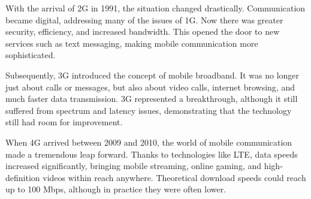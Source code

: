 \documentclass[english]{article}
\begin{document}
With the arrival of 2G in 1991, the situation changed drastically.
Communication became digital, addressing many of the issues of 1G. Now there
was greater security, efficiency, and increased bandwidth. This opened the door
to new services such as text messaging, making mobile communication more
sophisticated.

Subsequently, 3G introduced the concept of mobile broadband. It was no longer
just about calls or messages, but also about video calls, internet browsing,
and much faster data transmission. 3G represented a breakthrough, although it
still suffered from spectrum and latency issues, demonstrating that the
technology still had room for improvement.

When 4G arrived between 2009 and 2010, the world of mobile communication made a
tremendous leap forward. Thanks to technologies like LTE, data speeds increased
significantly, bringing mobile streaming, online gaming, and high-definition
videos within reach anywhere. Theoretical download speeds could reach up to 100
Mbps, although in practice they were often lower.
\end{document}
